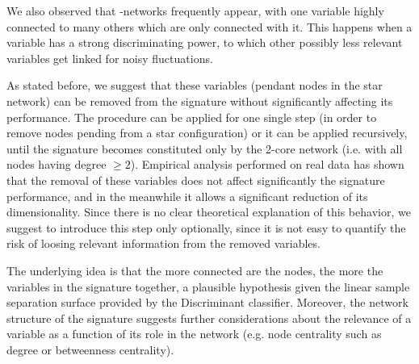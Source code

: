 \documentclass{standalone}
\begin{document}
We also observed that -networks frequently appear, with one variable highly connected to many others which are only connected with it.
This happens when a variable has a strong discriminating power, to which other possibly less relevant variables get linked for noisy fluctuations.

As stated before, we suggest that these variables (pendant nodes in the star network) can be removed from the signature without significantly affecting its performance.
The procedure can be applied for one single step (in order to remove nodes pending from a star configuration) or it can be applied recursively, until the signature becomes constituted only by the 2-core network (i.e. with all nodes having degree $\geq2$).
Empirical analysis performed on real data has shown that the removal of these variables does not affect significantly the signature performance, and in the meanwhile it allows a significant reduction of its dimensionality.
Since there is no clear theoretical explanation of this behavior, we suggest to introduce this step only optionally, since it is not easy to quantify the risk of loosing relevant information from the removed variables.

The underlying idea is that the more connected are the nodes, the more the variables in the signature  together, a plausible hypothesis given the linear sample separation surface provided by the Discriminant classifier.
Moreover, the network structure of the signature suggests further considerations about the relevance of a variable as a function of its role in the network (e.g. node centrality such as degree or betweenness centrality).
\end{document}
